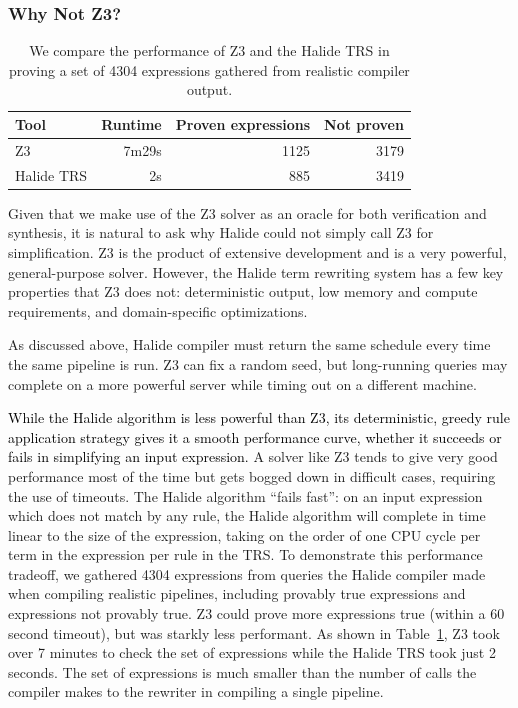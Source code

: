 \documentclass[acmsmall,review]{acmart}\settopmatter{printfolios=true,printccs=false,printacmref=false}
\newcommand{\modified}[1]{\textcolor{black}{{#1}}}
\begin{document}
\subsubsection{Why Not Z3?}
\begin{table}
\caption{We compare the performance of Z3 and the Halide TRS in proving a set of 4304 expressions gathered from realistic compiler output.}
\begin{tabular}{l|r|r|r}
Tool & Runtime & Proven expressions & Not proven \\
\hline
Z3 & 7m29s & 1125 & 3179 \\
Halide TRS & 2s & 885 & 3419 
\end{tabular}
\label{tab:simplifiervsz3}
\end{table}


Given that we make use of the Z3 solver as an oracle for both verification and synthesis, it is natural to ask why Halide could not simply call Z3 for simplification. Z3 is the product of extensive development and is a very powerful, general-purpose solver. However, the Halide term rewriting system has a few key properties that Z3 does not: deterministic output, low memory and compute requirements, and domain-specific optimizations.

As discussed above, Halide compiler must return the same schedule every time the same pipeline is run. Z3 can fix a random seed, but long-running queries may complete on a more powerful server while timing out on a different machine.

\modified{While the Halide algorithm is less powerful than Z3, its deterministic, greedy rule application strategy
gives it a smooth performance curve, whether it succeeds or fails in simplifying an input expression. }
A solver like Z3 tends to give very good performance most of the time but gets bogged down in difficult cases, requiring the use of timeouts. The Halide algorithm ``fails fast'': on an input expression which does not match by any rule,  the Halide algorithm will complete in time linear to the size of the expression, taking on the order of one CPU cycle per term in the expression per rule in the TRS. To demonstrate this performance tradeoff, we gathered 4304 expressions from queries the Halide compiler made when compiling realistic pipelines, including provably true expressions and expressions not provably true. Z3 could prove more expressions true (within a 60 second timeout), but was starkly less performant. As shown in Table~\ref{tab:simplifiervsz3}, Z3 took over 7 minutes to check the set of expressions while the Halide TRS took just 2 seconds. The set of expressions is much smaller than the number of calls the compiler makes to the rewriter in compiling a single pipeline.
\end{document}
